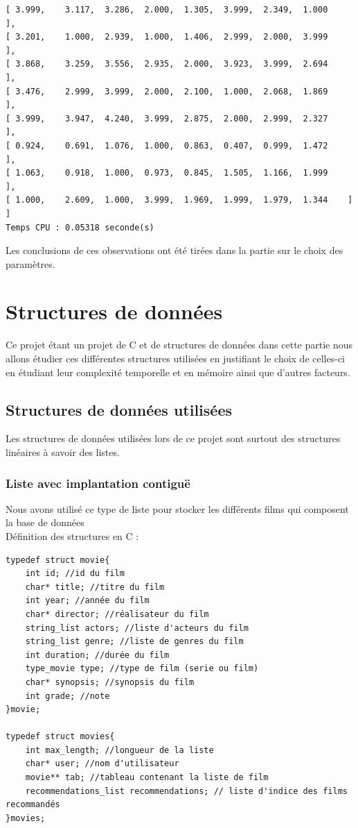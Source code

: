 \documentclass{article}
\begin{document}
\begin{enumerate}
\begin{verbatim}
[ 3.999, 	3.117, 	3.286, 	2.000, 	1.305, 	3.999, 	2.349, 	1.000	 ],
[ 3.201, 	1.000, 	2.939, 	1.000, 	1.406, 	2.999, 	2.000, 	3.999	 ],
[ 3.868, 	3.259, 	3.556, 	2.935, 	2.000, 	3.923, 	3.999, 	2.694	 ],
[ 3.476, 	2.999, 	3.999, 	2.000, 	2.100, 	1.000, 	2.068, 	1.869	 ],
[ 3.999, 	3.947, 	4.240, 	3.999, 	2.875, 	2.000, 	2.999, 	2.327	 ],
[ 0.924, 	0.691, 	1.076, 	1.000, 	0.863, 	0.407, 	0.999, 	1.472	 ],
[ 1.063, 	0.918, 	1.000, 	0.973, 	0.845, 	1.505, 	1.166, 	1.999	 ],
[ 1.000, 	2.609, 	1.000, 	3.999, 	1.969, 	1.999, 	1.979, 	1.344	 ]
]
Temps CPU : 0.05318 seconde(s)
\end{verbatim}
Les conclusions de ces observations ont été tirées dans la partie sur le choix des paramètres.
\end{enumerate}

\section{Structures de données}
Ce projet étant un projet de C et de structures de données dans cette partie nous allons étudier ces différentes structures utilisées en justifiant le choix de celles-ci en étudiant leur complexité temporelle et en mémoire ainsi que d’autres facteurs.
\subsection{Structures de données utilisées}
Les structures de données utilisées lors de ce projet sont surtout des structures linéaires à savoir des listes.
\subsubsection{Liste avec implantation contiguë }
Nous avons utilisé ce type de liste pour stocker les différents films qui composent la base de données\\
Définition des structures en C :\\
\begin{verbatim}
typedef struct movie{
    int id; //id du film
    char* title; //titre du film
    int year; //année du film
    char* director; //réalisateur du film
    string_list actors; //liste d'acteurs du film
    string_list genre; //liste de genres du film
    int duration; //durée du film
    type_movie type; //type de film (serie ou film)
    char* synopsis; //synopsis du film
    int grade; //note
}movie;

typedef struct movies{
    int max_length; //longueur de la liste
    char* user; //nom d'utilisateur
    movie** tab; //tableau contenant la liste de film
    recommendations_list recommendations; // liste d'indice des films recommandés
}movies;

\end{verbatim}
\end{document}
